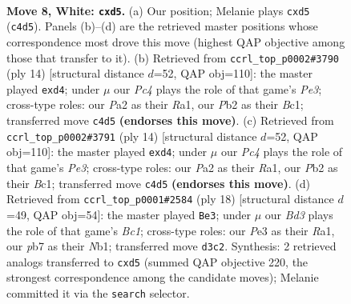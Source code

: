 \documentclass[11pt]{article}
\begin{document}
\begin{figure}[p]\centering
\begin{subfigure}{0.46\textwidth}\centering
\resizebox{\linewidth}{!}{%
\newchessgame
\chessboard[
  setfen={rnbq1rk1/pp3ppp/4p3/2pp3n/1bPP4/2NBPN2/PP3PPP/R1BQ1RK1 w - - 2 8},
  showmover=false,
  pgfstyle=straightmove, color=movearrow, markmove={c4-d5}
]}
\caption{}
\end{subfigure}\hfill
\begin{subfigure}{0.46\textwidth}\centering
\resizebox{\linewidth}{!}{%
\newchessgame
\chessboard[
  setfen={rnbq1rk1/pp3ppp/4pn2/3p4/1bPp4/2NBPN2/PP3PPP/R1BQ1RK1 w - - 0 8},
  showmover=false,
  pgfstyle=straightmove, color=movearrow, markmove={e3-d4}
]}
\caption{}
\end{subfigure}
\\[4pt]
\begin{subfigure}{0.46\textwidth}\centering
\resizebox{\linewidth}{!}{%
\newchessgame
\chessboard[
  setfen={rnbq1rk1/pp3ppp/4pn2/3p4/1bPp4/2NBPN2/PP3PPP/R1BQ1RK1 w - - 0 8},
  showmover=false,
  pgfstyle=straightmove, color=movearrow, markmove={e3-d4}
]}
\caption{}
\end{subfigure}\hfill
\begin{subfigure}{0.46\textwidth}\centering
\resizebox{\linewidth}{!}{%
\newchessgame
\chessboard[
  setfen={r2qkbnr/1p1n1pp1/4p2p/2ppPb2/p2P4/2PN4/PP2BPPP/RNBQ1RK1 w kq - 0 10},
  showmover=false,
  pgfstyle=straightmove, color=movearrow, markmove={c1-e3}
]}
\caption{}
\end{subfigure}
\caption{\textbf{Move 8, White: \texttt{cxd5}.} (a) Our position; Melanie plays \texttt{cxd5} (\texttt{c4d5}). Panels (b)--(d) are the retrieved master positions whose correspondence most drove this move (highest QAP objective among those that transfer to it). (b) Retrieved from \texttt{ccrl\_top\_p0002\#3790} (ply 14) [structural distance $d$=52, QAP obj=110]: the master played \texttt{exd4}; under $\mu$ our \emph{Pc4} plays the role of that game's \emph{Pe3}; cross-type roles: our \emph{P}a2 as their \emph{R}a1, our \emph{P}b2 as their \emph{B}c1; transferred move \texttt{c4d5} \textbf{(endorses this move)}. (c) Retrieved from \texttt{ccrl\_top\_p0002\#3791} (ply 14) [structural distance $d$=52, QAP obj=110]: the master played \texttt{exd4}; under $\mu$ our \emph{Pc4} plays the role of that game's \emph{Pe3}; cross-type roles: our \emph{P}a2 as their \emph{R}a1, our \emph{P}b2 as their \emph{B}c1; transferred move \texttt{c4d5} \textbf{(endorses this move)}. (d) Retrieved from \texttt{ccrl\_top\_p0001\#2584} (ply 18) [structural distance $d$=49, QAP obj=54]: the master played \texttt{Be3}; under $\mu$ our \emph{Bd3} plays the role of that game's \emph{Bc1}; cross-type roles: our \emph{P}e3 as their \emph{R}a1, our \emph{p}b7 as their \emph{N}b1; transferred move \texttt{d3c2}. Synthesis: 2 retrieved analogs transferred to \texttt{cxd5} (summed QAP objective 220, the strongest correspondence among the candidate moves); Melanie committed it via the \texttt{search} selector.}
\label{fig:thought-m14}
\end{figure}
\end{document}
